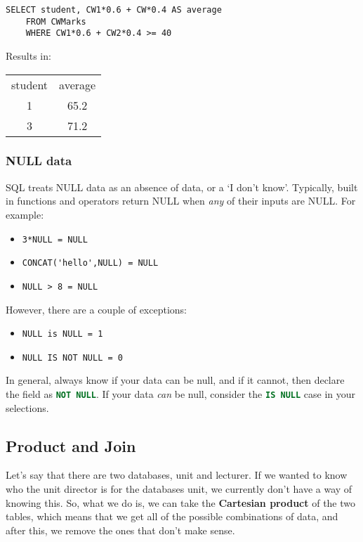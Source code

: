 \documentclass[11pt,a4paper,titlepage,dvipsnames,cmyk]{scrartcl}
\begin{document}
\begin{lstlisting}[]
SELECT student, CW1*0.6 + CW*0.4 AS average
    FROM CWMarks
    WHERE CW1*0.6 + CW2*0.4 >= 40
\end{lstlisting}

Results in:

\begin{center}
    \begin{tabular}{c|c}
        student & average \\ \hhline{=|=}
        1 & 65.2 \\
        3 & 71.2
    \end{tabular}
\end{center}

\subsubsection{NULL data}%
\label{ssub:NULL}

SQL treats NULL data as an absence of data, or a `I don't know'.
Typically, built in functions and operators return NULL when \textit{any}
of their inputs are NULL. For example:

\begin{itemize}
    \item \lstinline{3*NULL = NULL}
    \item \lstinline{CONCAT('hello',NULL) = NULL} 
    \item \lstinline{NULL > 8 = NULL} 
\end{itemize}

However, there are a couple of exceptions:

\begin{itemize}
    \item \lstinline{NULL is NULL = 1}
        \item \lstinline{NULL IS NOT NULL = 0} 
\end{itemize}

In general, always know if your data can be null, and if it cannot, then
declare the field as \lstinline[language=SQL]{NOT NULL}. If your data
\textit{can} be null, consider the \lstinline[language=SQL]{IS NULL} case
in your selections.

\subsection{Product and Join}%
\label{sub:product-join}

Let's say that there are two databases, unit and lecturer. If we wanted to
know who the unit director is for the databases unit, we currently don't
have a way of knowing this. So, what we do is, we can take the
\textbf{Cartesian product} of the two tables, which means that we get all
of the possible combinations of data, and after this, we remove the ones
that don't make sense.
\end{document}
